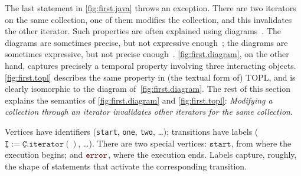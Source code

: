 \documentclass[preprint]{sigplanconf} %
\newcommand{\error}{\ensuremath{\textcolor{darkred}{\mathtt{error}}}\xspace}
\newcommand{\pattern}[1]{\ensuremath{\mathtt{\underline{#1}}}}
\newcommand{\start}{\ensuremath{\mathtt{start}}\xspace}
\theoremstyle{definition}
\theoremstyle{remark}
\begin{document}
The last statement in \autoref{fig:first.java} throws an exception.
There are two iterators on the same collection, one of them modifies the collection, and this invalidates the other iterator.
Such properties are often explained using diagrams~\cite{dblp:journals/scp/FieldGRY05,dblp:conf/issta/FinkYDRG06,dblp:conf/oopsla/bierhoffa07,dblp:conf/oopsla/naeeml08,dblp:conf/sigsoft/boddenlh08,dblp:conf/ecoop/bierhoffba09}.
The diagrams are sometimes precise, but not expressive enough~\cite{dblp:journals/scp/FieldGRY05,dblp:conf/issta/FinkYDRG06};
the diagrams are sometimes expressive, but not precise enough~\cite{dblp:conf/oopsla/bierhoffa07,dblp:conf/oopsla/naeeml08,dblp:conf/sigsoft/boddenlh08,dblp:conf/ecoop/bierhoffba09}.
\autoref{fig:first.diagram}, on the other hand, captures precisely a temporal property involving three interacting objects.
\autoref{fig:first.topl} describes the same property in (the textual form of) TOPL, and is clearly isomorphic to the diagram of~\autoref{fig:first.diagram}.
The rest of this section explains the semantics of \autoref{fig:first.diagram} and \autoref{fig:first.topl}:
\emph{Modifying a collection through an iterator invalidates other iterators for the same collection}.

Vertices have identifiers (\texttt{start}, \texttt{one}, \texttt{two}, \dots);
transitions have labels ($\pattern I:=\pattern C.\mathtt{iterator}()$, \dots).
There are two special vertices: \start, from where the execution begins; and \error, where the execution ends.
Labels capture, roughly, the shape of statements that activate the corresponding transition.
\end{document}
